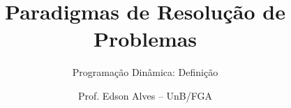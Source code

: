\title{Paradigmas de Resolução de Problemas}
\subtitle{Programação Dinâmica: Definição}
\author{Prof. Edson Alves -- UnB/FGA}
\date{}
